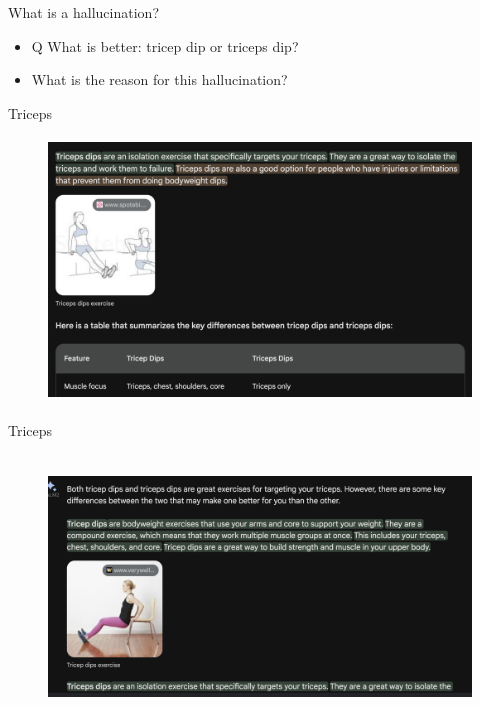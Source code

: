 \begin{vbframe}{What is a hallucination?}

\vfill


	\begin{itemize}


\item
 Q What is better: tricep dip or
 triceps dip?

\item \ques What is the reason for this hallucination?

\end{itemize}



\vfill


\end{vbframe}

\begin{vbframe}{Triceps}
\begin{figure}
\centering
\includegraphics[height = 7cm]{figure/triceps1.png}
\end{figure}
\vfill
\end{vbframe}

\begin{vbframe}{Triceps}
\begin{figure}
\centering
\includegraphics[height = 7cm]{figure/triceps2.png}
\end{figure}
\vfill
\end{vbframe}

